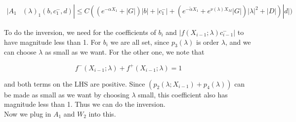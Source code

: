 \documentclass[12pt]{article}
\begin{document}
\begin{enumerate}
\begin{align*}
|A_1&(\lambda)_1(b, c_1^-, d)| \leq C( (e^{-\alpha X_1} + |G|) |b| + |c_1^-| + (e^{-\tilde{\alpha} X_1} + e^{\nu(\lambda)X_M} |G|) |\lambda|^2 + |D|) |d| )
\end{align*}




To do the inversion, we need for the coefficients of $b_i$ and $| f(X_{i-1}; \lambda) c_{i-1}^-|$ to have magnitude less than 1. For $b_i$ we are all set, since $p_3(\lambda)$ is order $\lambda$, and we can choose $\lambda$ as small as we want. For the other one, we note that 

\[
f^-(X_{i-1}; \lambda) + f^+(X_{i-1}; \lambda) = 1
\]

and both terms on the LHS are positive. Since $(p_2(\lambda; X_{i-1}) + p_4(\lambda))$ can be made as small as we want by choosing $\lambda$ small, this coefficient also has magnitude less than 1. Thus we can do the inversion. \\

Now we plug in $A_1$ and $W_2$ into this. 


\end{enumerate}
\end{document}
